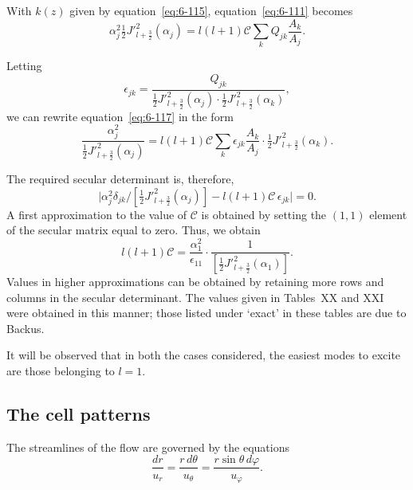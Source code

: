 With $k(z)$ given by equation~\eqref{eq:6-115}, equation~\eqref{eq:6-111} becomes
\begin{equation}\label{eq:6-117}
\alpha_j^2\tfrac{1}{2}J'^2_{l+\frac{3}{2}}(\alpha_j) = l(l+1)\mathcal{C}\sum_k Q_{jk}\frac{A_k}{A_j}.
\end{equation}

Letting
\begin{equation}\label{eq:6-118}
\epsilon_{jk} = \frac{Q_{jk}}{\tfrac{1}{2}J'^2_{l+\frac{3}{2}}(\alpha_j)\cdot\tfrac{1}{2}J'^2_{l+\frac{3}{2}}(\alpha_k)},
\end{equation}
we can rewrite equation~\eqref{eq:6-117} in the form
\begin{equation}\label{eq:6-119}
\frac{\alpha_j^2}{\tfrac{1}{2}J'^2_{l+\frac{3}{2}}(\alpha_j)} = l(l+1)\mathcal{C}\sum_k \epsilon_{jk}\frac{A_k}{A_j}\cdot\tfrac{1}{2}J'^2_{l+\frac{3}{2}}(\alpha_k).
\end{equation}

The required secular determinant is, therefore,
\begin{equation}\label{eq:6-120}
\bigl|\alpha_j^2\delta_{jk}/[\tfrac{1}{2}J'^2_{l+\frac{3}{2}}(\alpha_j)] - l(l+1)\mathcal{C}\,\epsilon_{jk}\bigr| = 0.
\end{equation}
A first approximation to the value of $\mathcal{C}$ is obtained by setting the $(1,1)$
element of the secular matrix equal to zero. Thus, we obtain
\begin{equation}\label{eq:6-121}
l(l+1)\mathcal{C} = \frac{\alpha_1^2}{\epsilon_{11}}\cdot\frac{1}{[\tfrac{1}{2}J'^2_{l+\frac{3}{2}}(\alpha_1)]}.
\end{equation}
Values in higher approximations can be obtained by retaining more
rows and columns in the secular determinant. The values given in
Tables~XX and XXI were obtained in this manner; those listed under
`exact' in these tables are due to Backus.

It will be observed that in both the cases considered, the easiest modes
to excite are those belonging to $l = 1$.

\subsection{The cell patterns}\label{sec:59a}
The streamlines of the flow are governed by the equations
\begin{equation}\label{eq:6-122}
\frac{dr}{u_r} = \frac{r\,d\theta}{u_\theta} = \frac{r\sin\theta\,d\varphi}{u_\varphi}.
\end{equation}

